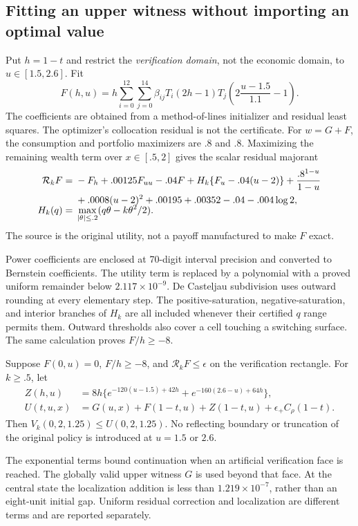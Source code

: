 \subsection{Fitting an upper witness without importing an optimal value}
Put $h=1-t$ and restrict the \emph{verification domain}, not the economic domain, to $u\in[1.5,2.6]$. Fit
\[
 F(h,u)=h\sum_{i=0}^{12}\sum_{j=0}^{14}\beta_{ij}
 T_i(2h-1)T_j\!\left(2\frac{u-1.5}{1.1}-1\right).
\]
The coefficients are obtained from a method-of-lines initializer and residual least squares. The optimizer's collocation residual is not the certificate. For $w=G+F$, the consumption and portfolio maximizers are $.8$ and $.8$. Maximizing the remaining wealth term over $x\in[.5,2]$ gives the scalar residual majorant
\begin{align}
 \mathcal R_kF={}&-F_h+.00125F_{uu}-.04F+
 H_k\{F_u-.04(u-2)\}+\frac{.8^{1-u}}{1-u}\\
 &+.0008(u-2)^2+.00195+.00352-.04-.004\log2,\label{r9:reduced}\\[-2mm]
 H_k(q)={}&\max_{|\theta|\leq.2}(q\theta-k\theta^2/2).\notag
\end{align}
The source is the original utility, not a payoff manufactured to make $F$ exact.

Power coefficients are enclosed at 70-digit interval precision and converted to Bernstein coefficients. The utility term is replaced by a polynomial with a proved uniform remainder below $2.117\times10^{-9}$. De Casteljau subdivision uses outward rounding at every elementary step. The positive-saturation, negative-saturation, and interior branches of $H_k$ are all included whenever their certified $q$ range permits them. Outward thresholds also cover a cell touching a switching surface. The same calculation proves $F/h\geq-8$.

\begin{proposition}\label{r9:upper}
Suppose $F(0,u)=0$, $F/h\geq-8$, and $\mathcal R_kF\leq\epsilon$ on the verification rectangle. For $k\geq.5$, let
\begin{align}
 Z(h,u)&=8h\{e^{-120(u-1.5)+42h}+e^{-160(2.6-u)+64h}\},\\
 U(t,u,x)&=G(u,x)+F(1-t,u)+Z(1-t,u)+\epsilon_+C_\rho(1-t).
\end{align}
Then $V_k(0,2,1.25)\leq U(0,2,1.25)$. No reflecting boundary or truncation of the original policy is introduced at $u=1.5$ or $2.6$.
\end{proposition}
The exponential terms bound continuation when an artificial verification face is reached. The globally valid upper witness $G$ is used beyond that face. At the central state the localization addition is less than $1.219\times10^{-7}$, rather than an eight-unit initial gap. Uniform residual correction and localization are different terms and are reported separately.

